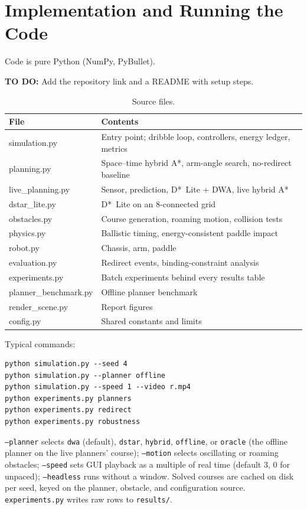 \documentclass[10pt,twocolumn]{article}
\newcommand{\gap}[1]{\par\noindent\colorbox{yellow!40}{\parbox{\dimexpr\linewidth-2\fboxsep}{\small\textbf{TO DO:} #1}}\par}
\begin{document}
\section{Implementation and Running the Code}
Code is pure Python (NumPy, PyBullet).
\gap{Add the repository link and a README with setup steps.}

\begin{table}[h]
\centering
\small
\setlength{\tabcolsep}{3pt}
\begin{tabular}{@{}>{\ttfamily}l p{4.4cm}@{}}
\toprule
\textrm{\textbf{File}} & \textbf{Contents} \\
\midrule
simulation.py & Entry point; dribble loop, controllers, energy ledger, metrics \\
planning.py & Space--time hybrid A*, arm-angle search, no-redirect baseline \\
live\_planning.py & Sensor, prediction, D*~Lite + DWA, live hybrid A* \\
dstar\_lite.py & D*~Lite on an 8-connected grid \\
obstacles.py & Course generation, roaming motion, collision tests \\
physics.py & Ballistic timing, energy-consistent paddle impact \\
robot.py & Chassis, arm, paddle \\
evaluation.py & Redirect events, binding-constraint analysis \\
experiments.py & Batch experiments behind every results table \\
planner\_benchmark.py & Offline planner benchmark \\
render\_scene.py & Report figures \\
config.py & Shared constants and limits \\
\bottomrule
\end{tabular}
\caption{Source files.}
\label{tab:files}
\end{table}

\noindent Typical commands:
{\small
\begin{verbatim}
python simulation.py --seed 4
python simulation.py --planner offline
python simulation.py --speed 1 --video r.mp4
python experiments.py planners
python experiments.py redirect
python experiments.py robustness
\end{verbatim}}
\texttt{--planner} selects \texttt{dwa} (default), \texttt{dstar},
\texttt{hybrid}, \texttt{offline}, or \texttt{oracle} (the offline planner
on the live planners' course); \texttt{--motion} selects oscillating or
roaming obstacles; \texttt{--speed} sets GUI playback as a multiple of real
time (default 3, 0 for unpaced); \texttt{--headless} runs without a window.
Solved courses are cached on disk per seed, keyed on the planner, obstacle,
and configuration source. \texttt{experiments.py} writes raw rows to
\texttt{results/}.
\end{document}
